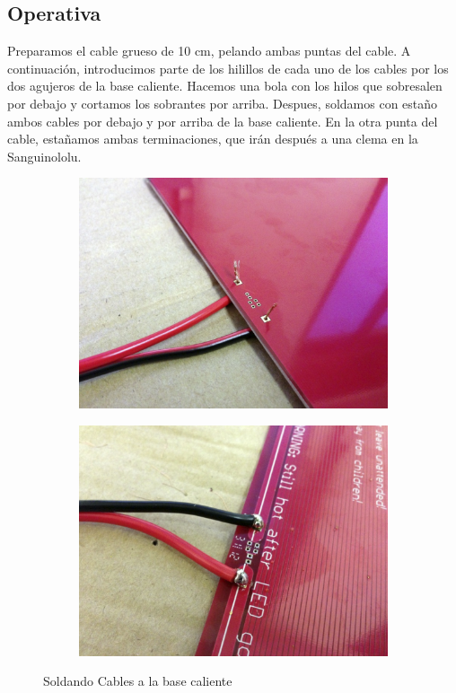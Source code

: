 	\subsection{Operativa}
	Preparamos el cable grueso de 10 cm, pelando ambas puntas del cable. A continuación, introducimos parte de los hilillos de cada uno de los cables por los dos agujeros de la base caliente. Hacemos una bola con los hilos que sobresalen por debajo y cortamos los sobrantes por arriba. Despues, soldamos con estaño ambos cables por debajo y por arriba de la base caliente. En la otra punta del cable, estañamos ambas terminaciones, que irán después a una clema en la Sanguinololu.
	\begin{figure}[H]
	    \centering
	    \begin{subfigure}[b]{0.4\textwidth}
	        \centering
	        \includegraphics[width=\textwidth]{../../Fotos/36b.jpg}
	    \end{subfigure}
	    \begin{subfigure}[b]{0.4\textwidth}
	       \centering
	       \includegraphics[width=\textwidth]{../../Fotos/36c.jpg}
	       
	    \end{subfigure}
	    \caption{Soldando Cables a la base caliente}\label{fig:1.y}
	\end{figure}
